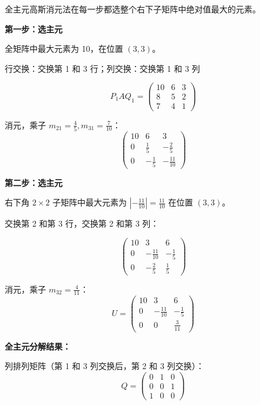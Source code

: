 \documentclass{article}
\begin{document}
\begin{solution}

  全主元高斯消元法在每一步都选整个右下子矩阵中绝对值最大的元素。

  \textbf{第一步：选主元}

  全矩阵中最大元素为 10，在位置 $(3,3)$。

  行交换：交换第 1 和 3 行；列交换：交换第 1 和 3 列

  \[
    P_1 A Q_1 =
    \begin{pmatrix}
      10 & 6 & 3 \\
      8 & 5 & 2 \\
      7 & 4 & 1
    \end{pmatrix}
  \]

  消元，乘子 $m_{21} = \frac{4}{5}, m_{31} = \frac{7}{10}$：
  \[
    \begin{pmatrix}
      10 & 6 & 3 \\
      0 & \frac{1}{5} & -\frac{2}{5} \\
      0 & -\frac{1}{5} & -\frac{11}{10}
    \end{pmatrix}
  \]

  \textbf{第二步：选主元}

  右下角 $2 \times 2$ 子矩阵中最大元素为 $|-\frac{11}{10}| = \frac{11}{10}$ 在位置 $(3,3)$。

  交换第 2 和第 3 行，交换第 2 和第 3 列：

  \[
    \begin{pmatrix}
      10 & 3 & 6 \\
      0 & -\frac{11}{10} & -\frac{1}{5} \\
      0 & -\frac{2}{5} & \frac{1}{5}
    \end{pmatrix}
  \]

  消元，乘子 $m_{32} = \frac{4}{11}$：
  \[
    U =
    \begin{pmatrix}
      10 & 3 & 6 \\
      0 & -\frac{11}{10} & -\frac{1}{5} \\
      0 & 0 & \frac{3}{11}
    \end{pmatrix}
  \]

  \textbf{全主元分解结果：}

  列排列矩阵（第 1 和 3 列交换后，第 2 和 3 列交换）：
  \[
    Q =
    \begin{pmatrix}
      0 & 1 & 0 \\
      0 & 0 & 1 \\
      1 & 0 & 0
    \end{pmatrix}
  \]


\end{solution}
\end{document}
